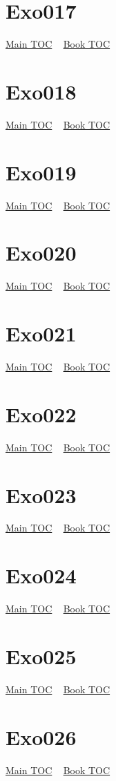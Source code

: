 \documentclass{book}
\begin{document}
  \section{Exo017}\hyperlink{toc}{Main TOC} ~ \hyperref[subsec:Exo]{Book TOC} 
  \section{Exo018}\hyperlink{toc}{Main TOC} ~ \hyperref[subsec:Exo]{Book TOC} 
  \section{Exo019}\hyperlink{toc}{Main TOC} ~ \hyperref[subsec:Exo]{Book TOC} 
  \section{Exo020}\hyperlink{toc}{Main TOC} ~ \hyperref[subsec:Exo]{Book TOC} 
  \section{Exo021}\hyperlink{toc}{Main TOC} ~ \hyperref[subsec:Exo]{Book TOC} 
  \section{Exo022}\hyperlink{toc}{Main TOC} ~ \hyperref[subsec:Exo]{Book TOC} 
  \section{Exo023}\hyperlink{toc}{Main TOC} ~ \hyperref[subsec:Exo]{Book TOC} 
  \section{Exo024}\hyperlink{toc}{Main TOC} ~ \hyperref[subsec:Exo]{Book TOC} 
  \section{Exo025}\hyperlink{toc}{Main TOC} ~ \hyperref[subsec:Exo]{Book TOC} 
  \section{Exo026}\hyperlink{toc}{Main TOC} ~ \hyperref[subsec:Exo]{Book TOC} 
\end{document}

